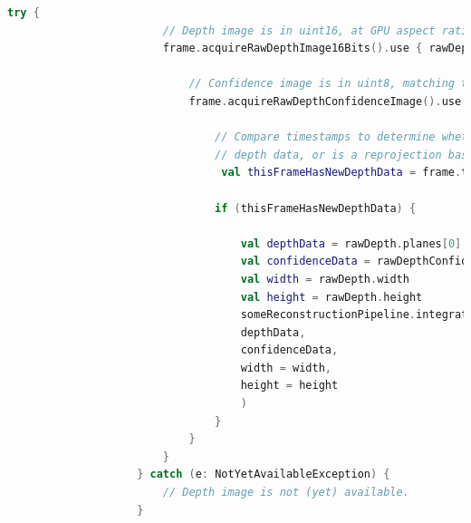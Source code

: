 \documentclass[crop=false, class=book]{standalone}
\begin{document}
		\begin{center}
				\begin{minipage}{0.95\textwidth}
					\begin{lstlisting}[caption={Estrazione di un'immagine di confidenza}, label={lst: confidence-image}, language=Kotlin]
					 try {
  						// Depth image is in uint16, at GPU aspect ratio, in native orientation.
  						frame.acquireRawDepthImage16Bits().use { rawDepth ->
  						
    						// Confidence image is in uint8, matching the depth image size.
    						frame.acquireRawDepthConfidenceImage().use { rawDepthConfidence ->
    						
      							// Compare timestamps to determine whether depth is is based on new
      							// depth data, or is a reprojection based on device movement.
     							 val thisFrameHasNewDepthData = frame.timestamp == rawDepth.timestamp
     							 
      							if (thisFrameHasNewDepthData) {
      							
        							val depthData = rawDepth.planes[0].buffer
        							val confidenceData = rawDepthConfidence.planes[0].buffer
        							val width = rawDepth.width
        							val height = rawDepth.height
        							someReconstructionPipeline.integrateNewImage(
          							depthData,
          							confidenceData,
         						 	width = width,
          							height = height
        							)
      							}
    						}
  						}
					} catch (e: NotYetAvailableException) {
  						// Depth image is not (yet) available.
					}
					
				\end{lstlisting}
			\end{minipage}
		\end{center}
		
\end{document}
